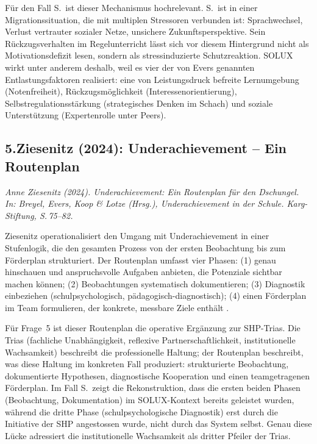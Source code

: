 \documentclass[ngerman, a4paper]{article}
\begin{document}
Für den Fall S.\ ist dieser Mechanismus hochrelevant. S.\ ist in einer
Migrationssituation, die mit multiplen Stressoren verbunden ist:
Sprachwechsel, Verlust vertrauter sozialer Netze, unsichere Zukunftsperspektive.
Sein Rückzugsverhalten im Regelunterricht lässt sich vor diesem Hintergrund
nicht als Motivationsdefizit lesen, sondern als stressinduzierte
Schutzreaktion. SOLUX wirkt unter anderem deshalb, weil es vier der von Evers
genannten Entlastungsfaktoren realisiert: eine von Leistungsdruck befreite
Lernumgebung (Notenfreiheit), Rückzugsmöglichkeit (Interessenorientierung),
Selbstregulationsstärkung (strategisches Denken im Schach) und soziale
Unterstützung (Expertenrolle unter Peers).


\subsection*{5.\quad Ziesenitz (2024): Underachievement -- Ein Routenplan}

\textit{Anne Ziesenitz (2024). Underachievement: Ein Routenplan für den
Dschungel. In: Breyel, Evers, Koop \& Lotze (Hrsg.), Underachievement
in der Schule. Karg-Stiftung, S.\,75--82.}

\medskip
Ziesenitz operationalisiert den Umgang mit Underachievement in einer
Stufenlogik, die den gesamten Prozess von der ersten Beobachtung bis zum
Förderplan strukturiert. Der Routenplan umfasst vier Phasen: (1) genau
hinschauen und anspruchsvolle Aufgaben anbieten, die Potenziale sichtbar machen
können; (2) Beobachtungen systematisch dokumentieren; (3) Diagnostik
einbeziehen (schulpsychologisch, pädagogisch-diagnostisch); (4) einen
Förderplan im Team formulieren, der konkrete, messbare Ziele enthält
\parencite[S.\,75--80]{ziesenitz2024routenplan}.

Für Frage~5 ist dieser Routenplan die operative Ergänzung zur SHP-Trias. Die
Trias (fachliche Unabhängigkeit, reflexive Partnerschaftlichkeit,
institutionelle Wachsamkeit) beschreibt die professionelle Haltung; der
Routenplan beschreibt, was diese Haltung im konkreten Fall produziert:
strukturierte Beobachtung, dokumentierte Hypothesen, diagnostische Kooperation
und einen teamgetragenen Förderplan. Im Fall S.\ zeigt die Rekonstruktion, dass
die ersten beiden Phasen (Beobachtung, Dokumentation) im SOLUX-Kontext bereits
geleistet wurden, während die dritte Phase (schulpsychologische Diagnostik)
erst durch die Initiative der SHP angestossen wurde, nicht durch das System
selbst. Genau diese Lücke adressiert die institutionelle Wachsamkeit als
dritter Pfeiler der Trias.
\end{document}
